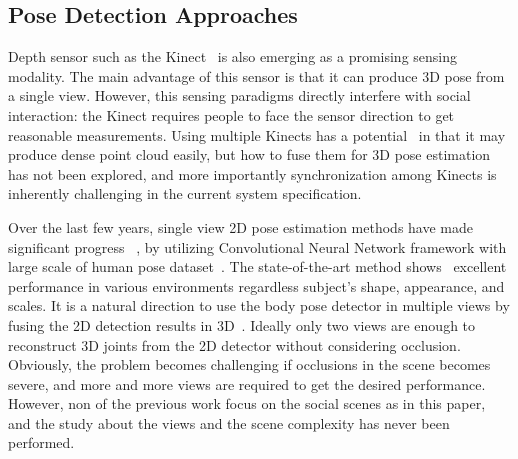 \subsection{Pose Detection Approaches}

Depth sensor such as the Kinect~\cite{Shotton2011,Baak2011} is also emerging as a promising sensing modality. The main advantage of this sensor is that it can produce 3D pose from a single view. However, this sensing paradigms directly interfere with social interaction: the Kinect requires people to face the sensor direction to get reasonable measurements. Using multiple Kinects has a potential~\cite{Ye-2012} in that it may produce dense point cloud easily, but how to fuse them for 3D pose estimation has not been explored, and more importantly synchronization among Kinects is inherently challenging in the current system specification. 

Over the last few years, single view 2D pose estimation methods have made significant progress ~\cite{Wei2016}, by utilizing Convolutional Neural Network framework with large scale of human pose dataset~\cite{Andriluka-14}. The state-of-the-art method shows~\cite{Wei2016} excellent performance in various environments regardless subject's shape, appearance, and scales. It is a natural direction to use the body pose detector in multiple views by fusing the 2D detection results in 3D~\cite{Burenius2013, Amin-13, Belagiannis2014, Elhayek-15, Elhayek-16}. Ideally only two views are enough to reconstruct 3D joints from the 2D detector without considering occlusion. Obviously, the problem becomes challenging if occlusions in the scene becomes severe, and more and more views are required to get the desired performance. However, non of the previous work focus on the social scenes as in this paper, and the study about the views and the scene complexity has never been performed. 







